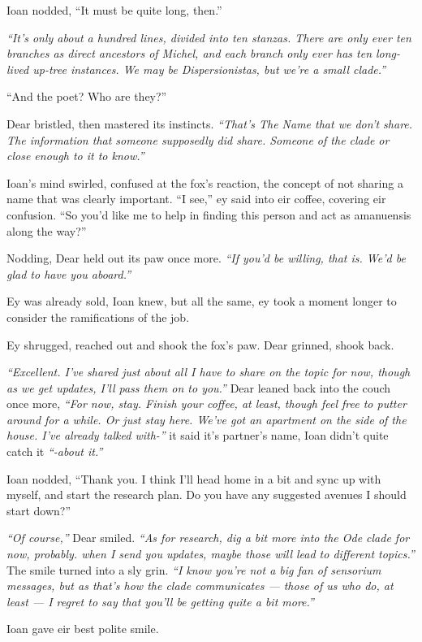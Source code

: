 Ioan nodded, ``It must be quite long, then.''

\emph{``It's only about a hundred lines, divided into ten stanzas. There are only ever ten branches as direct ancestors of Michel, and each branch only ever has ten long-lived up-tree instances. We may be Dispersionistas, but we're a small clade.''}

``And the poet? Who are they?''

Dear bristled, then mastered its instincts. \emph{``That's The Name that we don't share. The information that someone supposedly did share. Someone of the clade or close enough to it to know.''}

Ioan's mind swirled, confused at the fox's reaction, the concept of not sharing a name that was clearly important. ``I see,'' ey said into eir coffee, covering eir confusion. ``So you'd like me to help in finding this person and act as amanuensis along the way?''

Nodding, Dear held out its paw once more. \emph{``If you'd be willing, that is. We'd be glad to have you aboard.''}

Ey was already sold, Ioan knew, but all the same, ey took a moment longer to consider the ramifications of the job.

Ey shrugged, reached out and shook the fox's paw. Dear grinned, shook back.

\emph{``Excellent. I've shared just about all I have to share on the topic for now, though as we get updates, I'll pass them on to you.''} Dear leaned back into the couch once more, \emph{``For now, stay. Finish your coffee, at least, though feel free to putter around for a while. Or just stay here. We've got an apartment on the side of the house. I've already talked with-''} it said it's partner's name, Ioan didn't quite catch it \emph{``-about it.''}

Ioan nodded, ``Thank you. I think I'll head home in a bit and sync up with myself, and start the research plan. Do you have any suggested avenues I should start down?''

\emph{``Of course,''} Dear smiled. \emph{``As for research, dig a bit more into the Ode clade for now, probably. when I send you updates, maybe those will lead to different topics.''} The smile turned into a sly grin. \emph{``I know you're not a big fan of sensorium messages, but as that's how the clade communicates --- those of us who do, at least --- I regret to say that you'll be getting quite a bit more.''}

Ioan gave eir best polite smile.
